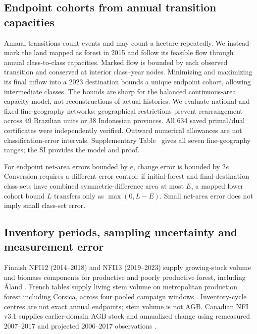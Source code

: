 \documentclass[11pt,a4paper]{article}
\begin{document}
\subsection{Endpoint cohorts from annual transition capacities}
Annual transitions count events and may count a hectare repeatedly. We instead mark the land mapped as forest in 2015 and follow its feasible flow through annual class-to-class capacities. Marked flow is bounded by each observed transition and conserved at interior class--year nodes. Minimizing and maximizing its final inflow into a 2023 destination bounds a unique endpoint cohort, allowing intermediate classes. The bounds are sharp for the balanced continuous-area capacity model, not reconstructions of actual histories. We evaluate national and fixed fine-geography networks; geographical restrictions prevent rearrangement across 49 Brazilian units or 38 Indonesian provinces. All 634 saved primal/dual certificates were independently verified. Outward numerical allowances are not classification-error intervals. Supplementary Table~ gives all seven fine-geography ranges; the SI provides the model and proof.

For endpoint net-area errors bounded by $e$, change error is bounded by $2e$. Conversion requires a different error control: if initial-forest and final-destination class sets have combined symmetric-difference area at most $E$, a mapped lower cohort bound $L$ transfers only as $\max(0,L-E)$. Small net-area error does not imply small class-set error.

\subsection{Inventory periods, sampling uncertainty and measurement error}
Finnish NFI12 (2014--2018) and NFI13 (2019--2023) supply growing-stock volume and biomass components for productive and poorly productive forest, including \AA land \citep{Korhonen2021,Korhonen2024}. French tables supply living stem volume on metropolitan production forest including Corsica, across four pooled campaign windows \citep{IGN2018,IGN2026}. Inventory-cycle centres are not exact annual endpoints; stem volume is not AGB. Canadian NFI v3.1 supplies earlier-domain AGB stock and annualized change using remeasured 2007--2017 and projected 2006--2017 observations \citep{CanadaNFI2025}.
\end{document}
